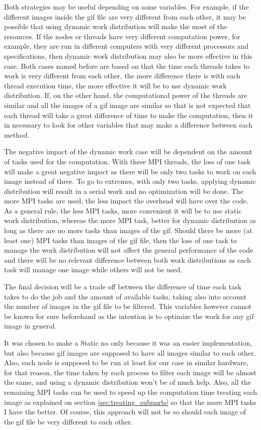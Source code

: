 \documentclass[conference,compsoc]{IEEEtran}
\begin{document}
Both strategies may be useful depending on some variables. For example, if the different images inside the gif file are very different from each other, it may be possible that using dynamic work distribution will make the most of the resources.
If the nodes or threads have very different computation power, for example, they are run in different computers with very different processors and specifications, then dynamic work distribution may also be more effective in this case.
Both cases named before are based on that the time each threads takes to work is very different from each other, the more difference there is with each thread execution time, the more effective it will be to use dynamic work distribution. If, on the other hand, the computational power of the threads are similar and all the images of a gif image are similar so that is not expected that each thread will take a great difference of time to make the computation, then it in necessary to look for other variables that may make a difference between each method.

The negative impact of the dynamic work case will be dependent on the amount of tasks used for the computation. With three MPI threads, the loss of one task will make a great negative impact as there will be only two tasks to work on each image instead of three. To go to extremes, with only two tasks, applying dynamic distribution will result in a serial work and no optimization will be done. The more MPI tasks are used, the less impact the overhead will have over the code. As a general rule, the less MPI tasks, more convenient it will be to use static work distribution, whereas the more MPI task, better for dynamic distribution as long as there are no more tasks than images of the gif. Should there be more (at least one) MPI tasks than images of the gif file, then the loss of one task to manage the work distribution will not affect the general performance of the code and there will be no relevant difference between both work distributions as each task will manage one image while others will not be used.

The final decision will be a trade off between the difference of time each task takes to do the job and the amount of available tasks, taking also into account the number of images in the gif file to be filtered. This variables however cannot be known for sure beforehand as the intention is to optimize the work for any gif image in general.

It was chosen to make a Static no only because it was an easier implementation, but also because gif images are supposed to have all images similar to each other. Also, each node is supposed to be run at least for our case in similar hardware, for that reason, the time taken by each process to filter each image will be almost the same, and using a dynamic distribution won't be of much help. 
Also, all the remaining MPI tasks can be used to speed up the computation time treating each image as explained on section \ref{sec:treating_subparts} so that the more MPI tasks I have the better.
Of course, this approach will not be so should each image of the gif file be very different to each other.
\end{document}
